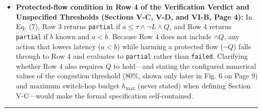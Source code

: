 \documentclass[11pt,a4paper]{article}
\begin{document}
\begin{enumerate}[leftmargin=1.6em,itemsep=3pt]
\begin{itemize}[leftmargin=1.8em,itemsep=2pt]
\item \textbf{Protected-flow condition in Row 4 of the Verification Verdict and Unspecified Thresholds (Sections V-C, V-D, and VI-B, Page 4):} In Eq. (7), Row 3 returns \texttt{partial} if $a \le \tau \land \neg L \land Q$, and Row 4 returns \texttt{partial} if $b \text{ known and } a < b$. Because Row 4 does not include $\land Q$, any action that lowers latency ($a < b$) while harming a protected flow ($\neg Q$) falls through to Row 4 and evaluates to \texttt{partial} rather than \texttt{failed}. Clarifying whether Row 4 also requires $Q$ to hold—and stating the configured numerical values of the congestion threshold ($80\%$, shown only later in Fig. 6 on Page 9) and maximum switch-hop budget $h_{\max}$ (never stated) when defining Section V-C—would make the formal specification self-contained.
\end{itemize}
\end{enumerate}
\par\medskip\noindent\rule{\linewidth}{0.4pt}\medskip\par
\end{document}
